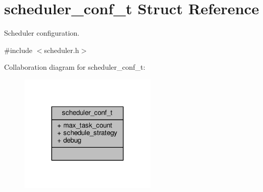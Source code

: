 \hypertarget{structscheduler__conf__t}{\section{scheduler\+\_\+conf\+\_\+t Struct Reference}
\label{structscheduler__conf__t}
}


Scheduler configuration.  




{\ttfamily \#include $<$scheduler.\+h$>$}



Collaboration diagram for scheduler\+\_\+conf\+\_\+t\+:
\nopagebreak
\begin{figure}[H]
\begin{center}
\leavevmode
\includegraphics[width=185pt]{structscheduler__conf__t__coll__graph}
\end{center}
\end{figure}
